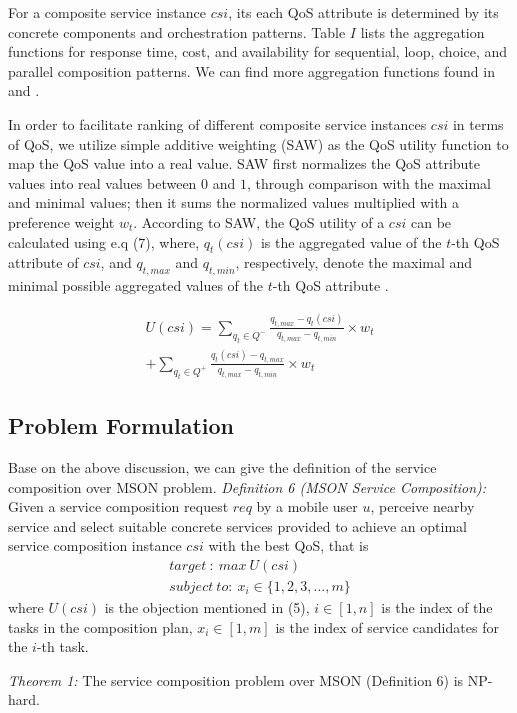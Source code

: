 \documentclass[10pt,journal,compsoc]{IEEEtran}
\begin{document}
For a composite service instance $csi$, its each QoS attribute is determined by its concrete components and orchestration patterns. Table $I$ lists the aggregation functions for response time, cost, and availability for sequential, loop, choice, and parallel composition patterns. We can find more aggregation functions found in \cite{jaeger2004qos} and \cite{zheng2013qos}.

In order to facilitate ranking of different composite service instances $csi$ in terms of QoS, we utilize simple additive weighting (SAW) as the QoS utility function to map the QoS value into a real value. SAW first normalizes the QoS attribute values into real values between $0$ and $1$, through comparison with the maximal and minimal values; then it sums the normalized values multiplied with a preference weight $w_t$. According to SAW, the QoS utility of a $csi$ can be calculated using e.q (7), where, $q_t(csi)$ is the aggregated value of the $t$-th QoS attribute of $csi$, and $q_{t,max}$ and $q_{t,min}$, respectively, denote the maximal and minimal possible aggregated values of the $t$-th QoS attribute \cite{Wu2016}.

\begin{eqnarray}
U(csi) = \sum_{q_t \in Q^-} \frac{q_{t,max}-q_t(csi)}{q_{t,max}-q_{t,min}}\times w_t \\\nonumber
+\sum_{q_t \in Q^+} \frac{q_t(csi)-q_{t,max}}{q_{t,max}-q_{t,min}}\times w_t
\end{eqnarray}

\subsection{Problem Formulation}
Base on the above discussion, we can give the definition of the service composition over MSON problem.
\textit{Definition 6 (MSON Service Composition):} Given a service composition request $req$ by a mobile user $u$, perceive nearby service and select suitable concrete services provided to achieve an optimal service composition instance $csi$ with the best QoS, that is
\begin{eqnarray}
target \ : \  max \ U(csi)\qquad\quad \\
subject \ to: \  x_i \in \{1,2,3,...,m \} \nonumber
\end{eqnarray}
where $U(csi)$ is the objection mentioned in (5), $i \in [1,n]$ is the index of the tasks in the composition plan, $x_i \in [1, m]$ is the index of service candidates for the $i$-th task.

\textit{Theorem 1:} The service composition problem over MSON (Definition 6) is NP-hard.
\end{document}
